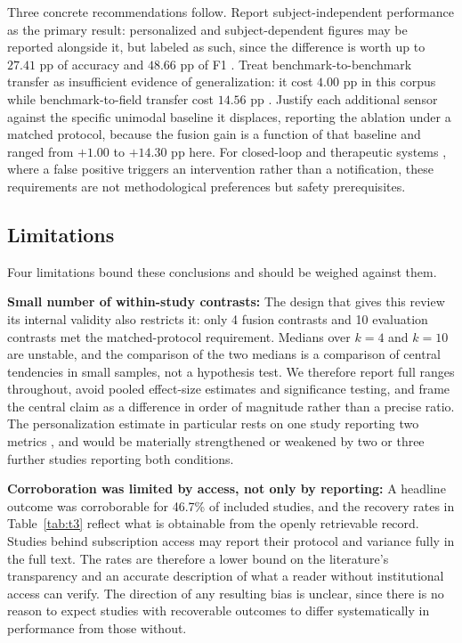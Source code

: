 Three concrete recommendations follow. Report subject-independent performance as the
primary result: personalized and subject-dependent figures may be reported alongside it, but
labeled as such, since the difference is worth up to $27.41$ pp of accuracy and $48.66$ pp
of F1 \cite{r33}. Treat benchmark-to-benchmark transfer as insufficient evidence of
generalization: it cost $4.00$ pp in this corpus while benchmark-to-field transfer cost
$14.56$ pp \cite{r49,r55,r61}. Justify each additional sensor against the specific
unimodal baseline it displaces, reporting the ablation under a matched protocol, because the
fusion gain is a function of that baseline and ranged from $+1.00$ to $+14.30$ pp here.
For closed-loop and therapeutic systems \cite{r38,r108}, where a false positive triggers an
intervention rather than a notification, these requirements are not methodological
preferences but safety prerequisites.

\subsection{Limitations}
Four limitations bound these conclusions and should be weighed against them.

\textbf{Small number of within-study contrasts:} The design that gives this review its
internal validity also restricts it: only 4 fusion contrasts and 10 evaluation contrasts met
the matched-protocol requirement. Medians over $k=4$ and $k=10$ are unstable, and the
comparison of the two medians is a comparison of central tendencies in small samples, not a
hypothesis test. We therefore report full ranges throughout, avoid pooled effect-size
estimates and significance testing, and frame the central claim as a difference in order of
magnitude rather than a precise ratio. The personalization estimate in particular rests on
one study reporting two metrics \cite{r33}, and would be materially strengthened or weakened
by two or three further studies reporting both conditions.

\textbf{Corroboration was limited by access, not only by reporting:} A headline outcome was
corroborable for 46.7\% of included studies, and the recovery rates in
Table~\ref{tab:t3} reflect what is obtainable from the openly retrievable record. Studies
behind subscription access may report their protocol and variance fully in the full text.
The rates are therefore a lower bound on the literature's transparency and an accurate
description of what a reader without institutional access can verify. The direction of any
resulting bias is unclear, since there is no reason to expect studies with recoverable
outcomes to differ systematically in performance from those without.

